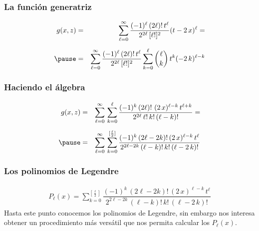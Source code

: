 \begin{frame}
\frametitle{La función generatriz}
\begin{eqnarray*}
g(x, z) &=& \sum_{\ell=0}^{\infty} \dfrac{(-1)^{\ell} \, (2 \ell)! \, t^{\ell}}{2^{2 \ell} \, [\ell!]^{2}} (t - 2 \, x)^{\ell} = \\[0.5em] \pause
&=& \sum_{\ell=0}^{\infty} \dfrac{(-1)^{\ell} \, (2 \ell)! \, t^{\ell}}{2^{2 \ell} \, [\ell!]^{2}} \sum_{k=0}^{\ell} \binom{\ell}{k} \, t^{k} (-2 \, k)^{\ell - k}
\end{eqnarray*}
\end{frame}
\begin{frame}
\frametitle{Haciendo el álgebra}
\begin{eqnarray*}
g(x, z) &=& \sum_{\ell=0}^{\infty} \, \sum_{k=0}^{\ell} \dfrac{(-1)^{k} \, (2 \ell)! \, \, (2 \, x)^{\ell -k} \, t^{\ell+k}}{2^{2 \ell} \, \ell! \, k! \, (\ell - k)!} = \\[0.5em] \pause
&=& \sum_{\ell=0}^{\infty} \, \sum_{k=0}^{[\frac{\ell}{2}]} \dfrac{(-1)^{k} \, (2 \ell - 2 k)! \, (2 \, x)^{\ell -k} \, t^{\ell}}{2^{2 \ell - 2 k} \, (\ell - k)! \, k! \, (\ell - 2 \, k)!}
\end{eqnarray*}
\end{frame}
\begin{frame}
\frametitle{Los polinomios de Legendre}
\begin{align*}
P_{\ell} (x) = \sum_{k=0}^{[\frac{\ell}{2}]} \dfrac{(-1)^{k} \, (2 \ell - 2 k)! \, (2 \, x)^{\ell -k} \, t^{\ell}}{2^{2 \ell - 2 k} \, (\ell - k)! \, k! \, (\ell - 2 \, k)!}
\end{align*}
\pause
Hasta este punto conocemos los polinomios de Legendre, sin embargo nos interesa obtener un procedimiento más versátil que nos permita calcular los $P_{\ell}(x)$.
\end{frame}
